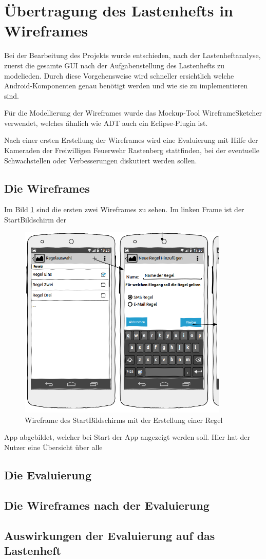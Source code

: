 \section{\"Ubertragung des Lastenhefts in Wireframes}

Bei der Bearbeitung des Projekts wurde entschieden, nach der Lastenheftanalyse, zuerst die gesamte GUI nach der Aufgabenstellung des Lastenhefts zu modelieden. Durch diese Vorgehensweise wird schneller ersichtlich welche Android-Komponenten genau ben\"otigt werden und wie sie zu implementieren sind.

F\"ur die Modellierung der Wireframes wurde das Mockup-Tool WireframeSketcher verwendet, welches \"ahnlich wie \ac{ADT} auch ein Eclipse-Plugin ist. 

Nach einer ersten Erstellung der Wireframes wird eine Evaluierung mit Hilfe der Kameraden der Freiwilligen Feuerwehr Rastenberg stattfinden, bei der eventuelle Schwachstellen oder Verbesserungen diskutiert werden sollen.

\subsection{Die Wireframes}
Im Bild \ref{Wireframe StartBildschirm} sind die ersten zwei Wireframes zu sehen. Im linken Frame ist der StartBildschirm der  
\begin{figure}
\vspace{-13pt}
\includegraphics[width=10cm]{Bilder/StartBildschirm.png}
\caption{Wireframe des StartBildschirms mit der Erstellung einer Regel}
\label{Wireframe StartBildschirm}
\vspace{-20pt}
\end{figure}
App abgebildet, welcher bei Start der App angezeigt werden soll. Hier hat der Nutzer eine \"Ubersicht \"uber alle
\FloatBarrier
\subsection{Die Evaluierung}

\subsection{Die Wireframes nach der Evaluierung}

\subsection{Auswirkungen der Evaluierung auf das Lastenheft}
